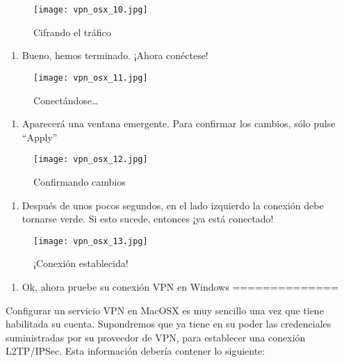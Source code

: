 \documentclass[10pt,a5paper,twoside,,]{book}
\providecommand{\tightlist}{%
  \setlength{\itemsep}{0pt}\setlength{\parskip}{0pt}}
\begin{document}
\begin{figure}[htbp]
\centering
\texttt{[image: vpn\_osx\_10.jpg]}
\caption{Cifrando el tráfico}
\end{figure}

\begin{enumerate}
\def\labelenumi{\arabic{enumi}.}
\setcounter{enumi}{11}
\tightlist
\item
  Bueno, hemos terminado. ¡Ahora conéctese!
\end{enumerate}

\begin{figure}[htbp]
\centering
\texttt{[image: vpn\_osx\_11.jpg]}
\caption{Conectándose\ldots{}}
\end{figure}

\begin{enumerate}
\def\labelenumi{\arabic{enumi}.}
\setcounter{enumi}{12}
\tightlist
\item
  Aparecerá una ventana emergente. Para confirmar los cambios, sólo
  pulse ``Apply''
\end{enumerate}

\begin{figure}[htbp]
\centering
\texttt{[image: vpn\_osx\_12.jpg]}
\caption{Confirmando cambios}
\end{figure}

\begin{enumerate}
\def\labelenumi{\arabic{enumi}.}
\setcounter{enumi}{13}
\tightlist
\item
  Después de unos pocos segundos, en el lado izquierdo la conexión debe
  tornarse verde. Si esto sucede, entonces ¡ya está conectado!
\end{enumerate}

\begin{figure}[htbp]
\centering
\texttt{[image: vpn\_osx\_13.jpg]}
\caption{¡Conexión establecida!}
\end{figure}

\begin{enumerate}
\def\labelenumi{\arabic{enumi}.}
\setcounter{enumi}{14}
\tightlist
\item
  Ok, ahora pruebe su conexión VPN en Windows ==============
\end{enumerate}

Configurar un servicio VPN en MacOSX es muy sencillo una vez que tiene
habilitada su cuenta. Supondremos que ya tiene en su poder las
credenciales suministradas por su proveedor de VPN, para establecer una
conexión L2TP/IPSec. Esta información debería contener lo siguiente:
\end{document}
